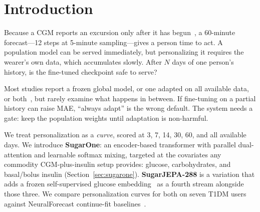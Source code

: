 \documentclass[11pt,a4paper]{article}
\begin{document}
\maketitle

\begin{abstract}
Continuous glucose monitors (CGM) are worn by tens of millions of people with
diabetes and increasingly by wellness users who may wear a sensor only once a
year. Available personal history therefore spans years of uninterrupted
recording down to a single 10--14~day wear. Fine-tuning a population model to
one person is usually reported at two endpoints---zero-shot and full
history---but on short histories fine-tuning can raise error. The practical
question is: how many days make adaptation safe?

We score personalization as a curve at 3, 7, 14, 30, 60, and full-history day
budgets. SugarJEPA-288---a compact multi-input transformer augmented with a
frozen CGM-JEPA self-supervised embedding~\citep{muhammad2026cgmjepa} as a
fourth stream---already beats SugarOne fine-tuned for 30~days, for all seven
type~1 diabetes mellitus (T1DM) users in the study. Its own fine-tune path
stays at or below the zero-shot floor from 3~days onward, while SugarOne and
NBEATSx need 60+ days before adaptation helps. Self-supervised
representations reduce the minimum safe personalization window from months to
days.
\end{abstract}

\section{Introduction}
\label{sec:intro}

Because a CGM reports an excursion only after it has
begun~\citep{schmelzeisen2015delay}, a 60-minute forecast---12 steps at
5-minute sampling---gives a person time to act. A population model can be
served immediately, but personalizing it requires the wearer's own data,
which accumulates slowly. After \(N\) days of one person's history, is the
fine-tuned checkpoint safe to serve?

Most studies report a frozen global model, or one adapted on all available
data, or both~\citep{sergazinov2022gluformer,zhu2023personalized}, but rarely
examine what happens in between. If fine-tuning on a partial history can
raise MAE, ``always adapt'' is the wrong default. The system needs a gate:
keep the population weights until adaptation is non-harmful.

We treat personalization as a \emph{curve}, scored at 3, 7, 14, 30, 60, and
all available days. We introduce \textbf{SugarOne}: an encoder-based
transformer with parallel dual-attention and learnable softmax mixing,
targeted at the covariates any commodity CGM-plus-insulin setup provides:
glucose, carbohydrates, and basal/bolus insulin
(Section~\ref{sec:sugarone}). \textbf{SugarJEPA-288} is a variation that
adds a frozen self-supervised glucose embedding~\citep{muhammad2026cgmjepa}
as a fourth stream alongside those three. We compare personalization curves
for both on seven T1DM users against NeuralForecast continue-fit
baselines~\citep{neuralforecast2022,olivares2023nbeatsx,lim2021tft}.
\end{document}
